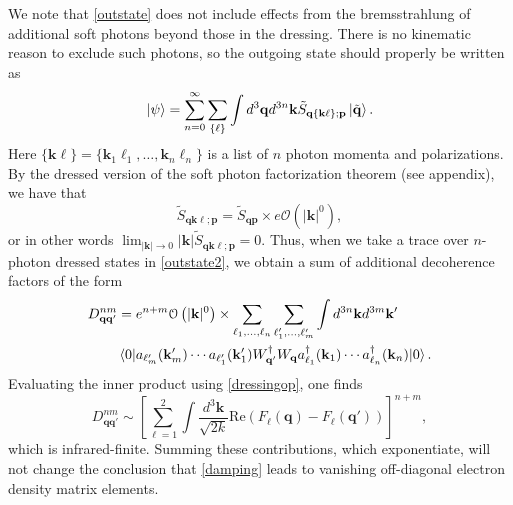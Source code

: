 \documentclass[twocolumn,prd]{revtex4}
\newcommand{\Oi}{\mathcal{O}}
\newcommand{\be}{\begin{equation}}
\newcommand{\ee}{\end{equation}}
\newcommand{\mb}{\mathbf}
\begin{document}
We note that \eqref{outstate} does not include effects from the bremsstrahlung of additional soft photons beyond those in the dressing. There is no kinematic reason to exclude such photons, so the outgoing state should properly be written as
\begin{align}
\begin{split}
\label{outstate2}
\ket{\psi} = \sum_{n=0}^{\infty} \sum_{\{\ell\}} \int d^3\mb{q} d^{3n}\mb{k} \tilde{S}_{\mb{q} \{ \mb{k} \ell \};\mb{p}} \ket{\tilde{\mb{q}}}.
\end{split}
\end{align}
Here $\{\mb{k} \ell\} = \{ \mb{k}_1 \ell_1, \ldots, \mb{k}_n \ell_n\}$ is a list of $n$ photon momenta and polarizations. By the dressed version of the soft photon factorization theorem (see appendix), we have that
\be
\tilde{S}_{\mb{q} \mb{k} \ell; \mb{p}} =  \tilde{S}_{\mb{q} \mb{p}} \times e \Oi \left( |\mb{k}|^0 \right),
\ee
or in other words $\lim_{|\mb{k}| \to 0} |\mb{k}| \tilde{S}_{\mb{q} \mb{k} \ell; \mb{p}} = 0$. Thus, when we take a trace over $n$-photon dressed states in \eqref{outstate2}, we obtain a sum of additional decoherence factors of the form
\begin{align}
\begin{split}
D^{nm}_{\mb{q} \mb{q}'} & = e^{n+m} \Oi\left(|\mb{k}|^0\right) \times \sum_{\ell_1, \ldots, \ell_n} \sum_{\ell'_1, \ldots, \ell'_m} \int d^{3n}\mb{k} d^{3m} \mb{k}' \\
& \braket{ 0 | a_{\ell'_m}(\mb{k}'_m) \cdots a_{\ell'_1}(\mb{k}'_1) W_{\mb{q}'}^{\dagger} W_{\mb{q}} a^{\dagger}_{\ell_1}(\mb{k}_1) \cdots a^{\dagger}_{\ell_n}(\mb{k}_n)  | 0 }.
\end{split}
\end{align}
Evaluating the inner product using \eqref{dressingop}, one finds
\be
D^{nm}_{\mb{q} \mb{q}'} \sim \left[ \sum_{\ell=1}^{2} \int \frac{d^3{\mb{k}}}{\sqrt{2 k}} \text{Re} \left( F_{\ell}(\mb{q}) - F_{\ell}(\mb{q}') \right) \right]^{n+m},
\ee
which is infrared-finite. Summing these contributions, which exponentiate, will not change the conclusion that \eqref{damping} leads to vanishing off-diagonal electron density matrix elements.
\end{document}

